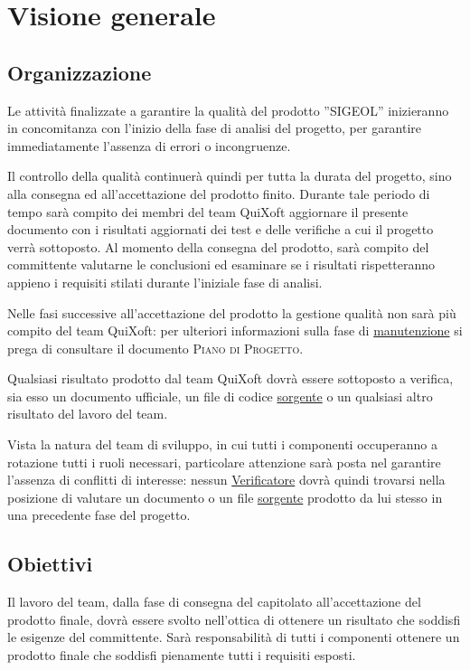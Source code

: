 \documentclass[11pt,a4paper]{article}
\begin{document}
\section{Visione generale}
\subsection{Organizzazione} 
Le attività finalizzate a garantire la qualità del prodotto ''SIGEOL'' inizieranno in concomitanza con l'inizio della fase di analisi del progetto, per garantire immediatamente l'assenza di errori o incongruenze.

Il controllo della qualità continuerà quindi per tutta la durata del progetto, sino alla consegna ed all'accettazione del prodotto finito. Durante tale periodo di tempo sarà compito dei membri del team QuiXoft aggiornare il presente documento con i risultati aggiornati dei test e delle verifiche a cui il progetto verrà sottoposto. Al momento della consegna del prodotto, sarà compito del committente valutarne le conclusioni ed esaminare se i risultati rispetteranno appieno i requisiti stilati durante l'iniziale fase di analisi.

Nelle fasi successive all'accettazione del prodotto la gestione qualità non sarà più compito del team QuiXoft: per ulteriori informazioni sulla fase di \underline{manutenzione} si prega di consultare il documento \textsc{Piano di Progetto}.

Qualsiasi risultato prodotto dal team QuiXoft dovrà essere sottoposto a verifica, sia esso un documento ufficiale, un file di codice \underline{sorgente} o un qualsiasi altro risultato del lavoro del team.

Vista la natura del team di sviluppo, in cui tutti i componenti occuperanno a rotazione tutti i ruoli necessari, particolare attenzione sarà posta nel garantire l'assenza di conflitti di interesse: nessun \underline{Verificatore} dovrà quindi trovarsi nella posizione di valutare un documento o un file \underline{sorgente} prodotto da lui stesso in una precedente fase del progetto.

\subsection{Obiettivi}
Il lavoro del team, dalla fase di consegna del capitolato all'accettazione del prodotto finale, dovrà essere svolto nell'ottica di ottenere un risultato che soddisfi le esigenze del committente. Sarà responsabilità di tutti i componenti ottenere un prodotto finale che soddisfi pienamente tutti i requisiti esposti.
\end{document}
